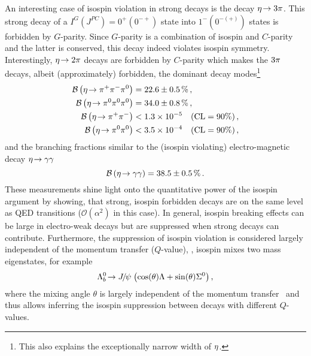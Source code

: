 An interesting case of isospin violation in strong decays is the decay $\eta\!\rightarrow 3 {\pi}$. This strong decay of a $I^G \left( J^{PC} \right) = 0^+ \left( 0^{-+} \right)$ state into $1^- \left( 0^{-(+)} \right)$ states is forbidden by $G$-parity.
Since $G$-parity is a combination of isospin and $C$-parity and the latter is conserved, this decay indeed violates isospin symmetry.
Interestingly, $\eta\!\rightarrow 2 {\pi}$ decays are forbidden by $C$-parity which makes the $3 {\pi}$ decays, albeit (approximately) forbidden, the dominant decay modes\footnote{This also explains the exceptionally narrow width of $\eta$.}~\cite{etaDecays,etaTopippim,etaTopizpiz}
\begin{align*}
    {\ensuremath{\mathcal{B}}}\left(\eta\!\rightarrow {\ensuremath{{\pi}^+}} {\ensuremath{{\pi}^-}} {\ensuremath{{\pi}^0}}\right) &= 22.6 \pm 0.5\,\% \,,\\
    {\mathcal{B}}\left(\eta\!\rightarrow {\ensuremath{{\pi}^0}} {\ensuremath{{\pi}^0}} {\ensuremath{{\pi}^0}}\right) &= 34.0 \pm 0.8\,\% \,,\\
    {\mathcal{B}}\left(\eta\!\rightarrow {\ensuremath{{\pi}^+}} {\ensuremath{{\pi}^-}}\right) &< 1.3 \times 10^{-5} \quad (\text{CL} = 90\%) \,,\\
    {\mathcal{B}}\left(\eta\!\rightarrow {\ensuremath{{\pi}^0}} {\ensuremath{{\pi}^0}}\right) &< 3.5 \times 10^{-4} \quad (\text{CL} = 90\%) \,,
\end{align*}
and the branching fractions similar to the (isospin violating) electro-magnetic decay $\eta\!\rightarrow \gamma\gamma$~\cite{etaDecays}
\begin{equation*}
    {\ensuremath{\mathcal{B}}}\left(\eta\!\rightarrow \gamma\gamma\right) = 38.5 \pm 0.5\,\% \,.
\end{equation*}
These measurements shine light onto the quantitative power of the isospin argument by showing, that strong, isospin forbidden decays are on the same level as QED transitions ($\mathcal{O}(\alpha^2)$ in this case).
In general, isospin breaking effects can be large in electro-weak decays but are suppressed when strong decays can contribute.
Furthermore, the suppression of isospin violation is considered largely independent of the momentum transfer ($Q$-value), \ie{}, isospin mixes two mass eigenstates, for example
$${{\Lambda}^0_{b}}\!\rightarrow {\ensuremath{{J\mskip -3mu/\mskip -2mu\psi\mskip 2mu}}} \left( \cos(\theta) {\Lambda} + \sin(\theta) \Sigma^0 \right),$$ 
where the mixing angle $\theta$ is largely independent of the momentum transfer~\cite{privcomGinoIsidori} and thus allows inferring the isospin suppression between decays with different $Q$-values.

